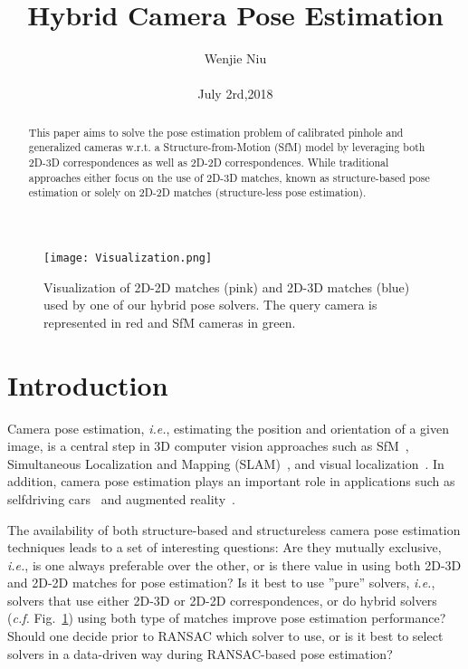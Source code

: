 \documentclass[10pt,twocolumn,letterpaper]{article}
\begin{document}
\title{Hybrid Camera Pose Estimation}

\author{Wenjie Niu\\\\ July 2rd,2018}

\maketitle

\begin{abstract}
This paper aims to solve the pose estimation problem of calibrated pinhole and generalized cameras w.r.t. a Structure-from-Motion (SfM) model by leveraging both 2D-3D correspondences as well as 2D-2D correspondences. While traditional approaches either focus on the use of 2D-3D matches, known as structure-based pose estimation or solely on 2D-2D matches (structure-less pose estimation).
\end{abstract}

\begin{figure}[!htp]
\begin{center}
   \texttt{[image: Visualization.png]}
\end{center}
   \caption{Visualization of 2D-2D matches (pink) and 2D-3D
matches (blue) used by one of our hybrid pose solvers. The query
camera is represented in red and SfM cameras in green.\cite{Camposeco_2018_CVPR}}
\label{fig:Visualization}
\end{figure}

\section{Introduction}
Camera pose estimation, \emph{i.e.}, estimating the position and orientation of a given image, is a central step in 3D computer vision approaches such as SfM~\cite{Sameer_2009_ICCV}, Simultaneous Localization and Mapping (SLAM)~\cite{Davison2007MonoSLAM}, and visual localization~\cite{Camposeco2017Toroidal}. In addition, camera pose estimation plays an important role in applications such as selfdriving cars~\cite{HANE201714} and augmented reality~\cite{Middelberg2014Scalable}.\par
The availability of both structure-based and structureless camera pose estimation techniques leads to a set of interesting questions: Are they mutually exclusive, \emph{i.e.}, is one always preferable over the other, or is there value in using both 2D-3D and 2D-2D matches for pose estimation? Is it best to use ”pure” solvers, \emph{i.e.}, solvers that use either 2D-3D or 2D-2D correspondences, or do hybrid solvers (\emph{c.f.}  Fig.~\ref{fig:Visualization}) using both type of matches improve pose estimation performance? Should one decide prior to RANSAC which solver to use, or is it best to select solvers in a data-driven way during RANSAC-based pose estimation?\par
\end{document}
